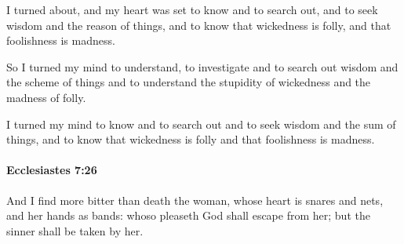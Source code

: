 			\begin{versebox}
					\item[BHS] 
					\item[LXX] 
					\item[ASV] I turned about, and my heart was set to know and to search out, and to seek wisdom and the reason of things, and to know that wickedness is folly, and that foolishness is madness.
					\item[NIV] So I turned my mind to understand, to investigate and to search out wisdom and the scheme of things and to understand the stupidity of wickedness and the madness of folly.
					\item[NRSV] I turned my mind to know and to search out and to seek wisdom and the sum of things, and to know that wickedness is folly and that foolishness is madness.
			\end{versebox}

		\paragraph{Ecclesiastes 7:26} %
			\label{ECCLESIASTES-7-26}

			And I find more bitter than death the woman, whose heart is snares and nets, and her hands as bands: whoso pleaseth God shall escape from her; but the sinner shall be taken by her.

